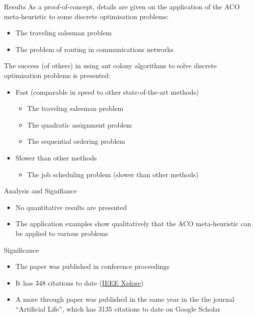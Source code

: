 \documentclass[aspectratio=169]{beamer}
\begin{document}
    \begin{frame}{Results}
        As a proof-of-concept, details are given on the application of the ACO meta-heuristic to some discrete optimisation problems:
        \begin{itemize}
            \item The traveling salesman problem
            \item The problem of routing in communications networks
        \end{itemize}
        \vspace{0.125in}
        The success (of others) in using ant colony algorithms to solve discrete optimisation problems is presented:
        \begin{itemize}
            \item Fast (comparable in speed to other state-of-the-art methods)
            \begin{itemize}
                \item The traveling salesman problem
                \item The quadratic assignment problem
                \item The sequential ordering problem
            \end{itemize}
            \item Slower than other methods
            \begin{itemize}
                \item The job scheduling problem (slower than other methods)
            \end{itemize}
        \end{itemize}
    \end{frame}

    \begin{frame}{Analysis and Signifiance}
        \begin{itemize}
            \item No quantitative results are presented
            \item The application examples show qualitatively that the ACO meta-heuristic can be applied to various problems
        \end{itemize}        
    \end{frame}

    \begin{frame}{Significance}
        \begin{itemize}
            \item The paper was published in conference proceedings
            \item It has 348 citations to date (\href{http://ieeexplore.ieee.org/document/782657/   }{IEEE Xplore})
            \item A more through paper was published in the same year in the the journal ``Artificial Life'', which has 3135 citations to date on Google Scholar
        \end{itemize}
    \end{frame}
    
\end{document}
